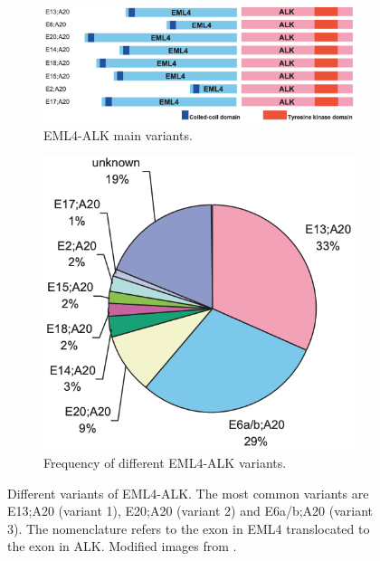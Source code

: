 \begin{figure}[t]
    \centering
    \begin{subfigure}{0.64\textwidth}
        \centering
        \includegraphics[width=\textwidth]{Images/chapter_1/variants_EML4-ALK.png}
        \caption{EML4-ALK main variants.}
        \label{fig:EML4-ALK_variants}
    \end{subfigure}
    \hfill
    \begin{subfigure}{0.34\textwidth}
        \centering
        \includegraphics[width=\textwidth]{Images/chapter_1/frequency_variants_EML4-ALK.png}
        \caption{Frequency of different EML4-ALK variants.}
        \label{fig:EML4-ALK_frequency}
    \end{subfigure}
    \caption{Different variants of EML4-ALK. The most common variants are E13;A20 (variant 1), E20;A20 (variant 2) and E6a\slash b;A20 (variant 3). The nomenclature refers to the exon in EML4 translocated to the exon in ALK. Modified images from \cite{EML4_ALK_biology}.}
    \label{fig:EML4-ALK}
\end{figure}

